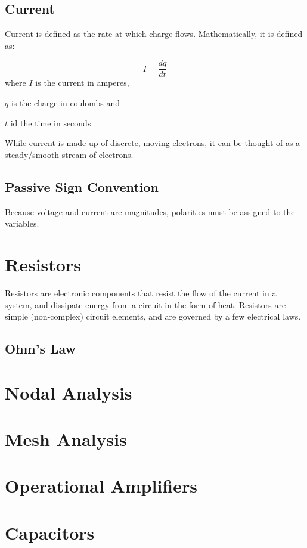 \documentclass[12pt, letterpaper]{memoir}
\begin{document}
\section{Current}
Current is defined as the rate at which charge flows. Mathematically, it is defined as:
\begin{eqlisting} \label{currenteq}
	\centering
	\begin{equation}
		I = \frac{dq}{dt}
	\end{equation}
	\small where $I$ is the current in amperes,
	
	$q$ is the charge in coulombs and
	
	$t$ id the time in seconds
\end{eqlisting}
While current is made up of discrete, moving electrons, it can be thought of as a steady/smooth stream of electrons.
\section{Passive Sign Convention}
Because voltage and current are magnitudes, polarities must be assigned to the variables.

\chapter{Resistors}
Resistors are electronic components that resist the flow of the current in a system, and dissipate energy from a circuit in the form of heat. Resistors are simple (non-complex) circuit elements, and are governed by a few electrical laws.
\section{Ohm's Law}


\chapter{Nodal Analysis}

\chapter{Mesh Analysis}

\chapter{Operational Amplifiers}

\chapter{Capacitors}
\end{document}
